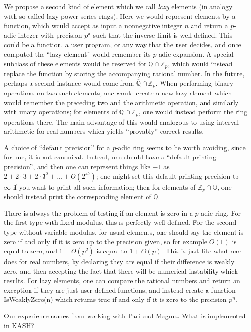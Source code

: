 \documentclass[12pt]{amsart}
\newcommand{\Q}{\mathbb Q}
\newcommand{\Z}{\mathbb Z}
\newcommand{\Qbar}{\overline{\mathbb Q}}
\begin{document}
We propose a second kind of element which we call \emph{lazy} elements (in analogy with so-called lazy power series rings).  Here we would represent elements by a function, which would accept as input a nonnegative integer $n$ and return a $p$-adic integer with precision $p^n$ such that the inverse limit is well-defined.  This could be a function, a user program, or any way that the user decides, and once computed the ``lazy element'' would remember its $p$-adic expansion.  A special subclass of these elements would be reserved for $\Q \cap \Z_p$, which would instead replace the function by storing the accompanying rational number.  In the future, perhaps a second instance would come from $\Qbar \cap \Z_p$.  When performing binary operations on two such elements, one would create a new lazy element which would remember the preceding two and the arithmetic operation, and similarly with unary operations; for elements of $\Q \cap \Z_p$, one would instead perform the ring operations there.  The main advantage of this would analogous to using interval arithmetic for real numbers which yields ``provably'' correct results.

A choice of ``default precision'' for a $p$-adic ring seems to be worth avoiding, since for one, it is not canonical.  Instead, one should have a ``default printing precision'', and then one can represent things like $-1$ as $2+2\cdot 3 + 2\cdot 3^2 + \dots + O(2^{40})$; one might set this default printing precision to $\infty$ if you want to print all such information; then for elements of $\Z_p \cap \Q$, one should instead print the corresponding element of $\Q$.  

There is always the problem of testing if an element is zero in a $p$-adic ring.  For the first type with fixed modulus, this is perfectly well-defined.  For the second type without variable modulus, for usual elements, one should say the element is zero if and only if it is zero up to the precision given, so for example $O(1)$ is equal to zero, and $1+O(p^2)$ is equal to $1+O(p)$.  This is just like what one does for real numbers, by declaring they are equal if their difference is weakly zero, and then accepting the fact that there will be numerical instability which results.  For lazy elements, one can compare the rational numbers and return an exception if they are just user-defined functions, and instead create a function \textsf{IsWeaklyZero(n)} which returns true if and only if it is zero to the precision $p^n$.

Our experience comes from working with Pari and Magma.  What is implemented in KASH?
\end{document}
